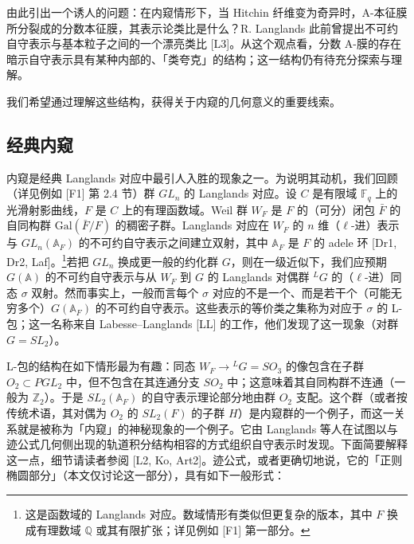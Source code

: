 \documentclass[11pt,a4paper]{article}
\begin{document}
由此引出一个诱人的问题：在内窥情形下，当 Hitchin 纤维变为奇异时，A-本征膜所分裂成的分数本征膜，其表示论类比是什么？R. Langlands 此前曾提出不可约自守表示与基本粒子之间的一个漂亮类比 [L3]。从这个观点看，分数 A-膜的存在暗示自守表示具有某种内部的、「类夸克」的结构；这一结构仍有待充分探索与理解。

我们希望通过理解这些结构，获得关于内窥的几何意义的重要线索。

\subsection{经典内窥}

内窥是经典 Langlands 对应中最引人入胜的现象之一。为说明其动机，我们回顾（详见例如 [F1] 第 2.4 节）群 $GL_n$ 的 Langlands 对应。设 $C$ 是有限域 $\mathbb{F}_q$ 上的光滑射影曲线，$F$ 是 $C$ 上的有理函数域。Weil 群 $W_F$ 是 $F$ 的（可分）闭包 $\bar F$ 的自同构群 $\mathrm{Gal}(\bar F/F)$ 的稠密子群。Langlands 对应在 $W_F$ 的 $n$ 维（$\ell$-进）表示与 $GL_n(\mathbb{A}_F)$ 的不可约自守表示之间建立双射，其中 $\mathbb{A}_F$ 是 $F$ 的 adele 环 [Dr1, Dr2, Laf]。\footnote{这是函数域的 Langlands 对应。数域情形有类似但更复杂的版本，其中 $F$ 换成有理数域 $\mathbb{Q}$ 或其有限扩张；详见例如 [F1] 第一部分。}若把 $GL_n$ 换成更一般的约化群 $G$，则在一级近似下，我们应预期 $G(\mathbb{A})$ 的不可约自守表示与从 $W_F$ 到 $G$ 的 Langlands 对偶群 ${}^{L}G$ 的（$\ell$-进）同态 $\sigma$ 双射。然而事实上，一般而言每个 $\sigma$ 对应的不是一个、而是若干个（可能无穷多个）$G(\mathbb{A}_F)$ 的不可约自守表示。这些表示的等价类之集称为对应于 $\sigma$ 的 L-包；这一名称来自 Labesse--Langlands [LL] 的工作，他们发现了这一现象（对群 $G=SL_2$）。

L-包的结构在如下情形最为有趣：同态 $W_F\to{}^{L}G=SO_3$ 的像包含在子群 $O_2\subset PGL_2$ 中，但不包含在其连通分支 $SO_2$ 中；这意味着其自同构群不连通（一般为 $\mathbb{Z}_2$）。于是 $SL_2(\mathbb{A}_F)$ 的自守表示理论部分地由群 $O_2$ 支配。这个群（或者按传统术语，其对偶为 $O_2$ 的 $SL_2(F)$ 的子群 $H$）是内窥群的一个例子，而这一关系就是被称为「内窥」的神秘现象的一个例子。它由 Langlands 等人在试图以与迹公式几何侧出现的轨道积分结构相容的方式组织自守表示时发现。下面简要解释这一点，细节请读者参阅 [L2, Ko, Art2]。迹公式，或者更确切地说，它的「正则椭圆部分」（本文仅讨论这一部分），具有如下一般形式：

\end{document}
